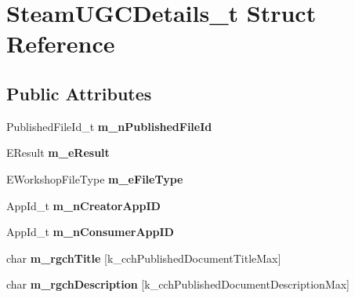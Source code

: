 \hypertarget{structSteamUGCDetails__t}{}\section{Steam\+U\+G\+C\+Details\+\_\+t Struct Reference}
\label{structSteamUGCDetails__t}
\subsection*{Public Attributes}
\begin{DoxyCompactItemize}
\item 
\hypertarget{structSteamUGCDetails__t_abf1ab7c590bca6df10b125c9c43a6353}{}Published\+File\+Id\+\_\+t {\bfseries m\+\_\+n\+Published\+File\+Id}\label{structSteamUGCDetails__t_abf1ab7c590bca6df10b125c9c43a6353}

\item 
\hypertarget{structSteamUGCDetails__t_a5448666b2f9cce824ab0166f838b418e}{}E\+Result {\bfseries m\+\_\+e\+Result}\label{structSteamUGCDetails__t_a5448666b2f9cce824ab0166f838b418e}

\item 
\hypertarget{structSteamUGCDetails__t_af563a2cd3d7368fd5f5651aa5f5abf2b}{}E\+Workshop\+File\+Type {\bfseries m\+\_\+e\+File\+Type}\label{structSteamUGCDetails__t_af563a2cd3d7368fd5f5651aa5f5abf2b}

\item 
\hypertarget{structSteamUGCDetails__t_a8763f843e1761df0cb55acc425e4adcd}{}App\+Id\+\_\+t {\bfseries m\+\_\+n\+Creator\+App\+I\+D}\label{structSteamUGCDetails__t_a8763f843e1761df0cb55acc425e4adcd}

\item 
\hypertarget{structSteamUGCDetails__t_ad5bce931c752397229715a0906670c6d}{}App\+Id\+\_\+t {\bfseries m\+\_\+n\+Consumer\+App\+I\+D}\label{structSteamUGCDetails__t_ad5bce931c752397229715a0906670c6d}

\item 
\hypertarget{structSteamUGCDetails__t_a9c4f233425fb3d2a4ca5ce4df2ac7b21}{}char {\bfseries m\+\_\+rgch\+Title} \mbox{[}k\+\_\+cch\+Published\+Document\+Title\+Max\mbox{]}\label{structSteamUGCDetails__t_a9c4f233425fb3d2a4ca5ce4df2ac7b21}

\item 
\hypertarget{structSteamUGCDetails__t_a75803d008cb392bb2930e6789e1f28a4}{}char {\bfseries m\+\_\+rgch\+Description} \mbox{[}k\+\_\+cch\+Published\+Document\+Description\+Max\mbox{]}\label{structSteamUGCDetails__t_a75803d008cb392bb2930e6789e1f28a4}


\end{DoxyCompactItemize}

